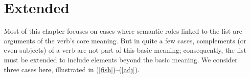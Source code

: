 \documentclass[output=paper
 	        ,biblatex
                ,babelshorthands
                ,newtxmath
                ,draftmode
                ,colorlinks, citecolor=brown
]{langscibook}
\begin{document}






\section{Extended \texorpdfstring{\argst}{ARG-ST}}
\label{sec:extended-arg-st}

%
Most of this chapter focuses on cases where semantic roles linked to the \argst list are arguments
of the verb's core meaning. But in quite a few cases, complements (or even subjects) of a verb are
not part of this basic meaning; consequently, the \argst list must be extended to include elements
beyond the basic meaning. We consider three cases here, illustrated in (\ref{fish})--(\ref{adj}).
\end{document}
